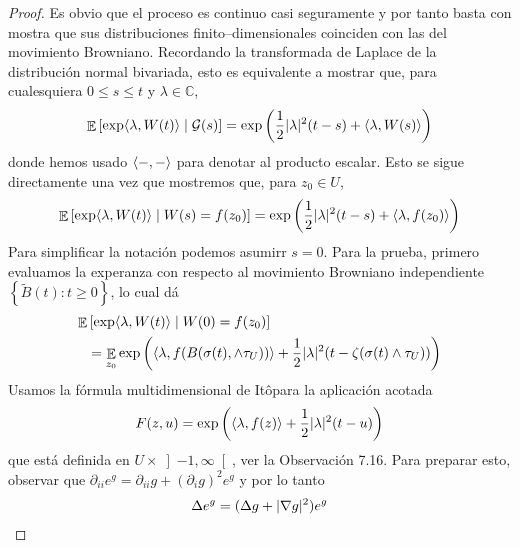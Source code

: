\documentclass{report}
\newcommand{\ito}{Itô}
\newcommand{\brownian}{B}
\newcommand{\alteredBrownian}{\widetilde{\brownian}}
\newcommand{\wiener}{W}
\newcommand{\placeholderParameter}{-}
\newcommand{\complexNumbers}{\mathbb{C}}
\DeclareMathOperator{\Expectation}{\mathbb{E}}
\DeclarePairedDelimiter{\abs}{\lvert}{\rvert}
\DeclarePairedDelimiter{\ang}{\langle}{\rangle}
\theoremstyle{plain}
\theoremstyle{remark}
\theoremstyle{definition}
\begin{document}
\begin{proof}
  Es obvio que el proceso es continuo casi seguramente y por tanto basta con mostra que sus distribuciones finito--dimensionales coinciden con las del movimiento Browniano.
  Recordando la transformada de Laplace de la distribución normal bivariada, esto es equivalente a mostrar que, para cualesquiera \(0 \leq s \leq t\) y \(\lambda \in \complexNumbers\),
  \begin{align}
    \Expectation\left[ \exp \ang{\lambda, \wiener(t)} \mid \mathcal{G}(s) \right]
    =
    \exp\left( \frac{1}{2} \abs{\lambda}^2 (t - s) + \ang{\lambda, \wiener(s)} \right)
  \end{align}
  donde hemos usado \(\ang{\placeholderParameter , \placeholderParameter}\) para denotar al producto escalar.
  Esto se sigue directamente una vez que mostremos que, para \(z_0 \in U\),
  \begin{align}
    \label{equation:ConformalInvarianceOfPlanarBrownianMotion_MainEquation}
    \Expectation\left[ 
      \exp\ang{\lambda, \wiener(t)} 
      \mid \wiener(s) = f(z_0)
    \right]
    =
    \exp\left( \frac{1}{2} \abs{\lambda}^2 (t - s) + \ang{\lambda, f(z_0)} \right)
  \end{align}
  Para simplificar la notación podemos asumirr \(s = 0\).
  Para la prueba, primero evaluamos la experanza con respecto al movimiento Browniano independiente \(\left\{ \alteredBrownian(t) : t \geq 0 \right\}\), lo cual dá
  \begin{align}
    \Expectation &\left[
      \exp \ang{\lambda, \wiener(t)}
      \mid 
      \wiener(0) = f(z_0) 
    \right]
    \\&=
    \Expectation_{z_0} \exp \left(
      \ang{\lambda, f(\brownian(\sigma(t), \wedge \tau_U))} 
      + \frac{1}{2} \abs{\lambda}^2 (t - \zeta(\sigma(t) \wedge \tau_U))
    \right)
  \end{align}
  Usamos la fórmula multidimensional de \ito para la aplicación acotada
  \begin{align}
    F(z, u)
    =
    \exp\left(
      \ang{\lambda, f(z)}
      + \frac{1}{2} \abs{\lambda}^2 (t - u)
    \right)
  \end{align}
  que está definida en \(U \times \left] - 1, \infty \right[\), ver la Observación 7.16.
  Para preparar esto, observar que \(\partial_{i i} e^g = \partial_{i i} g + (\partial_i g)^2 e^g\) y por lo tanto
  \begin{align}
    \label{equation:LaplacianOfExponential}
    \Delta e^g
    =
    (\Delta g + \abs{\nabla g}^2) e^g

\end{align}
\end{proof}
\end{document}
